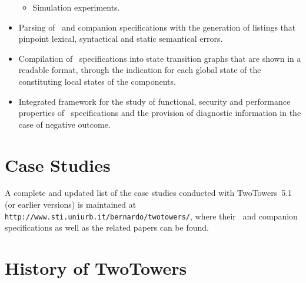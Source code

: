 \begin{itemize}
\begin{itemize}
\item Simulation experiments.

		\end{itemize}

\item Parsing of \aemilia\ and companion specifications with the generation of listings that pinpoint
lexical, syntactical and static semantical errors.

\item Compilation of \aemilia\ specifications into state transition graphs that are shown in a readable
format, through the indication for each global state of the constituting local states of the components.

\item Integrated framework for the study of functional, security and performance properties of \aemilia\
specifications and the provision of diagnostic information in the case of negative outcome.

	\end{itemize}



\section{Case Studies}

A complete and updated list of the case studies conducted with TwoTowers~5.1 (or earlier versions) is
maintained at \verb+http://www.sti.uniurb.it/bernardo/twotowers/+, where their \aemilia\ and companion
specifications as well as the related papers can be found.



\section{History of TwoTowers}

